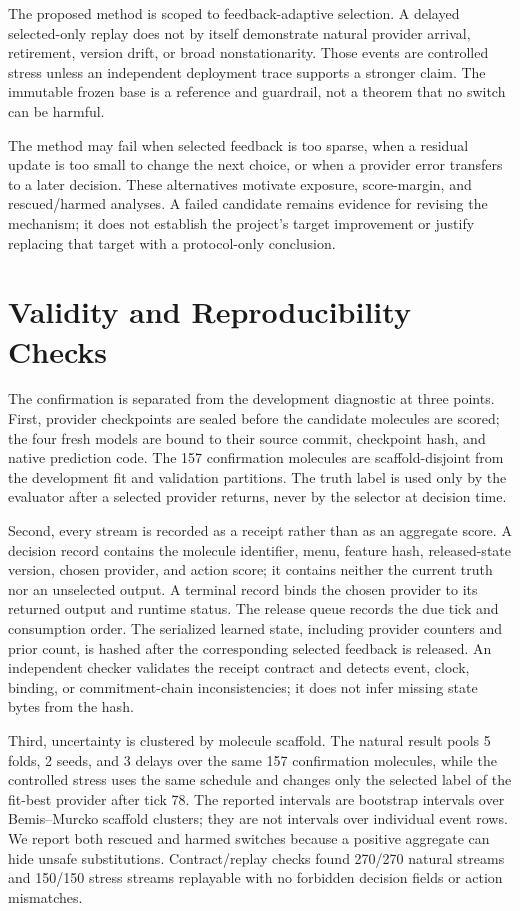\documentclass[sigconf,anonymous]{aamas}
\begin{document}
The proposed method is scoped to feedback-adaptive selection. A delayed selected-only replay does not by itself demonstrate natural provider arrival, retirement, version drift, or broad nonstationarity. Those events are controlled stress unless an independent deployment trace supports a stronger claim. The immutable frozen base is a reference and guardrail, not a theorem that no switch can be harmful.

The method may fail when selected feedback is too sparse, when a residual update is too small to change the next choice, or when a provider error transfers to a later decision. These alternatives motivate exposure, score-margin, and rescued/harmed analyses. A failed candidate remains evidence for revising the mechanism; it does not establish the project's target improvement or justify replacing that target with a protocol-only conclusion.

\section{Validity and Reproducibility Checks}
The confirmation is separated from the development diagnostic at three points. First, provider checkpoints are sealed before the candidate molecules are scored; the four fresh models are bound to their source commit, checkpoint hash, and native prediction code. The 157 confirmation molecules are scaffold-disjoint from the development fit and validation partitions. The truth label is used only by the evaluator after a selected provider returns, never by the selector at decision time.

Second, every stream is recorded as a receipt rather than as an aggregate score. A decision record contains the molecule identifier, menu, feature hash, released-state version, chosen provider, and action score; it contains neither the current truth nor an unselected output. A terminal record binds the chosen provider to its returned output and runtime status. The release queue records the due tick and consumption order. The serialized learned state, including provider counters and prior count, is hashed after the corresponding selected feedback is released. An independent checker validates the receipt contract and detects event, clock, binding, or commitment-chain inconsistencies; it does not infer missing state bytes from the hash.

Third, uncertainty is clustered by molecule scaffold. The natural result pools 5 folds, 2 seeds, and 3 delays over the same 157 confirmation molecules, while the controlled stress uses the same schedule and changes only the selected label of the fit-best provider after tick 78. The reported intervals are bootstrap intervals over Bemis--Murcko scaffold clusters; they are not intervals over individual event rows. We report both rescued and harmed switches because a positive aggregate can hide unsafe substitutions. Contract/replay checks found 270/270 natural streams and 150/150 stress streams replayable with no forbidden decision fields or action mismatches.
\end{document}

